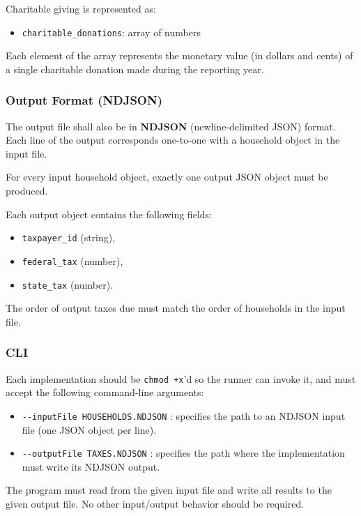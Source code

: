 Charitable giving is represented as:

\begin{itemize}
  \item \texttt{charitable\_donations}: array of numbers
\end{itemize}

Each element of the array represents the monetary value (in dollars and cents) of a single charitable donation made during the reporting year.

\subsubsection{Output Format (NDJSON)}

The output file shall also be in \textbf{NDJSON} (newline-delimited JSON) format.
Each line of the output corresponds one-to-one with a household object in the input file.

For every input household object, exactly one output JSON object must be produced.

Each output object contains the following fields:

\begin{itemize}
  \item \texttt{taxpayer\_id} (string),
  \item \texttt{federal\_tax} (number),
  \item \texttt{state\_tax} (number).
\end{itemize}

The order of output taxes due must match the order of households in the input file.

\subsubsection{CLI}

Each implementation should be \texttt{chmod +x}'d so the runner can invoke it, and must accept the following command-line arguments:

\begin{itemize}
  \item \verb|--inputFile HOUSEHOLDS.NDJSON| : specifies the path to an NDJSON input file (one JSON object per line).
  \item \verb|--outputFile TAXES.NDJSON| : specifies the path where the implementation must write its NDJSON output.
\end{itemize}

The program must read from the given input file and write all results to the given output file.
No other input/output behavior should be required.